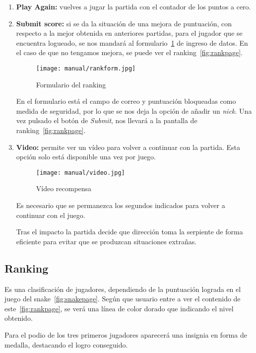 \begin{enumerate}
	\item \textbf{Play Again:} vuelves a jugar la partida con el contador de los puntos a cero.
	\item \textbf{Submit score:} si se da la situación de una mejora de puntuación, con respecto a la mejor obtenida en anteriores partidas, para el jugador que se encuentra logueado, se nos mandará al formulario~\ref{fig:rankform} de ingreso de datos.
	En el caso de que no tengamos mejora, se puede ver el ranking~\ref{fig:rankpage}.
	
	\begin{figure}[H]
		\centering
		\texttt{[image: manual/rankform.jpg]}
		\caption{Formulario del ranking}\label{fig:rankform}
	\end{figure}
	
	En el formulario está el campo de correo y puntuación bloqueadas como medida de seguridad, por lo que se nos deja la opción de añadir un \emph{nick}. Una vez pulsado el botón de \emph{Submit}, nos llevará a la pantalla de ranking~\ref{fig:rankpage}.
	
	\item \textbf{Video:} permite ver un vídeo para volver a continuar con la partida. Esta opción solo está disponible una vez por juego.
	
		\begin{figure}[H]
		\centering
		\texttt{[image: manual/video.jpg]}
		\caption{Vídeo recompensa}\label{fig:video}
		\end{figure}
	
	Es necesario que se permanezca los segundos indicados para volver a continuar con el juego. 
	
	Tras el impacto la partida decide que dirección toma la serpiente de forma eficiente para evitar que se produzcan situaciones extrañas.
		
\end{enumerate}

\subsection{Ranking}\label{rank}
Es una clasificación de jugadores, dependiendo de la puntuación lograda en el juego del snake~\ref{fig:snakepage}. Según que usuario entre a ver el contenido de este~\ref{fig:rankpage}, se verá una línea de color dorado que indicando el nivel obtenido.

Para el podio de los tres primeros jugadores aparecerá una insignia en forma de medalla, destacando el logro conseguido.

